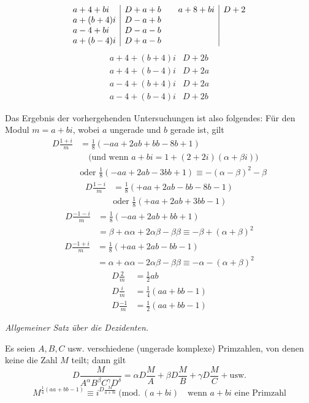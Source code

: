 \[
\begin{array}{l|l@{\qquad}l|l}
a+4+bi&D+a+b&a+8+bi&D+2\\
a+(b+4)i&D-a+b&&\\
a-4+bi&D-a-b&&\\
a+(b-4)i&D+a-b&&
\end{array}
\]
\[
\begin{array}{l|l}
a+4+(b+4)i&D+2b\\
a+4+(b-4)i&D+2a\\
a-4+(b+4)i&D+2a\\
a-4+(b-4)i&D+2b
\end{array}
\]

Das Ergebnis der vorhergehenden Untersuchungen ist also folgendes:
Für den Modul $m=a+bi$, wobei $a$ ungerade und $b$ gerade ist, gilt
\[
\begin{aligned}
D\frac{1+i}{m}&=\tfrac18(-aa+2ab+bb-8b+1)\\
&\quad\text{(und wenn }a+bi=1+(2+2i)(\alpha+\beta i))\\
&\text{oder }\tfrac18(-aa+2ab-3bb+1)\equiv-(\alpha-\beta)^2-\beta
\end{aligned}
\]
\[
\begin{aligned}
D\frac{1-i}{m}&=\tfrac18(+aa+2ab-bb-8b-1)\\
&\text{oder }\tfrac18(+aa+2ab+3bb-1)
\end{aligned}
\]
\[
\begin{aligned}
D\frac{-1-i}{m}&=\tfrac18(-aa+2ab+bb+1)\\
&=\beta+\alpha\alpha+2\alpha\beta-\beta\beta\equiv-\beta+(\alpha+\beta)^2
\end{aligned}
\]
\[
\begin{aligned}
D\frac{-1+i}{m}&=\tfrac18(+aa+2ab-bb-1)\\
&=\alpha+\alpha\alpha-2\alpha\beta-\beta\beta\equiv-\alpha-(\alpha+\beta)^2
\end{aligned}
\]
\[
\begin{aligned}
D\frac2m&=\tfrac12ab\\
D\frac im&=\tfrac14(aa+bb-1)\\
D\frac{-1}m&=\tfrac12(aa+bb-1)
\end{aligned}
\]

\begin{center}\emph{Allgemeiner Satz über die Dezidenten.}\end{center}
Es seien $A,B,C$ usw. verschiedene (ungerade komplexe) Primzahlen, von denen keine die Zahl $M$ teilt; dann gilt
\[
D\frac{M}{A^\alpha B^\beta C^\gamma D^\delta}=\alpha D\frac MA+\beta D\frac MB+\gamma D\frac MC+\text{usw.}
\]
\[
M^{\frac14(aa+bb-1)}\equiv i^{D\frac{M}{a+bi}}\ (\mathrm{mod.}\ (a+bi)\quad\text{wenn }a+bi\text{ eine Primzahl}
\]

